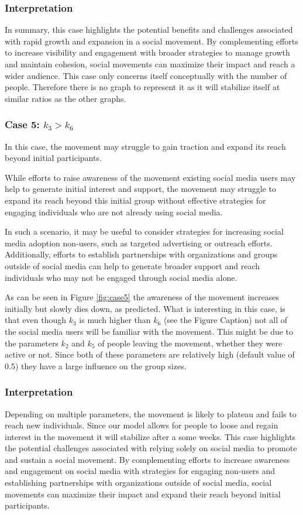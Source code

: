 \documentclass{article}
\begin{document}
    \subsubsection*{Interpretation} In summary,  this case highlights the potential benefits and challenges associated with rapid growth and expansion in a social movement. By complementing efforts to increase visibility and engagement with broader strategies to manage growth and maintain cohesion, social movements can maximize their impact and reach a wider audience.
    This case only concerns itself conceptually with the number of people. Therefore there is no graph to represent it as it will stabilize itself at similar ratios as the other graphs.

    \subsubsection*{Case 5: $k_3 > k_6$}
    In this case, the movement may struggle to gain traction and expand its reach beyond initial participants.
    
    While efforts to raise awareness of the movement  existing social media users may help to generate initial interest and support, the movement may struggle to expand its reach beyond this initial group without effective strategies for engaging individuals who are not already using social media.
    
    In such a scenario, it may be useful to consider strategies for increasing social media adoption  non-users, such as targeted advertising or outreach efforts. Additionally, efforts to establish partnerships with organizations and groups outside of social media can help to generate broader support and reach individuals who may not be engaged through social media alone.

    As can be seen in Figure \ref{fig:case5} the awareness of the movement increases initially but slowly dies down, as predicted. What is interesting in this case, is that even though $k_3$ is much higher than $k_6$ (see the Figure Caption) not all of the social media users will be familiar with the movement. This might be due to the parameters $k_2$ and $k_5$ of people leaving the movement, whether they were active or not. Since both of these parameters are relatively high (default value of 0.5) they have a large influence on the group sizes. 
    
    \subsubsection*{Interpretation}
    Depending on multiple parameters, the movement is likely to plateau and fails to reach new individuals. Since our model allows for people to loose and regain interest in the movement it will stabilize after a some weeks. This case highlights the potential challenges associated with relying solely on social media to promote and sustain a social movement. By complementing efforts to increase awareness and engagement on social media with strategies for engaging non-users and establishing partnerships with organizations outside of social media, social movements can maximize their impact and expand their reach beyond initial participants.
\end{document}

